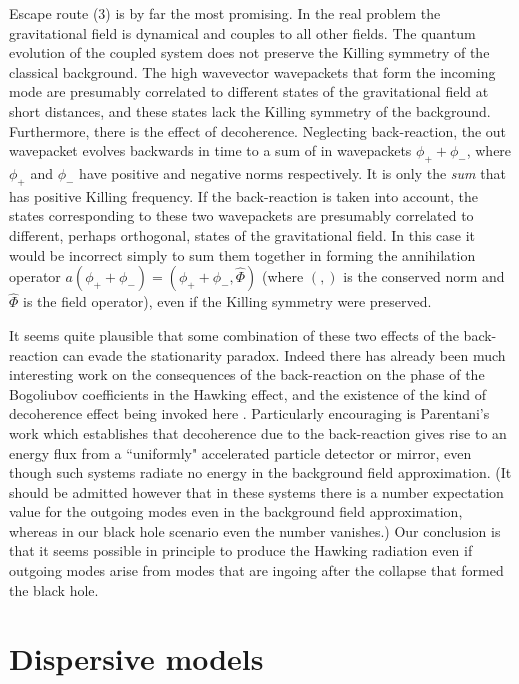 Escape route (3) is by far the most promising. In the real problem the
gravitational field is dynamical and couples to all other fields.  The
quantum evolution of the coupled system does not preserve the Killing
symmetry of the classical background. The high wavevector wavepackets
that form the incoming mode are presumably correlated to different
states of the gravitational field at short distances, and these states
lack the Killing symmetry of the background. Furthermore, there is the
effect of decoherence. Neglecting back-reaction, the out wavepacket
evolves backwards in time to a sum of in wavepackets $\phi_+ + \phi_-$,
where $\phi_+$ and $\phi_-$ have positive and negative norms
respectively.  It is only the {\it sum} that has positive Killing
frequency.  If the back-reaction is taken into account, the states
corresponding to these two wavepackets are presumably correlated to
different, perhaps orthogonal, states of the gravitational field. In
this case it would be incorrect simply to sum them together in forming
the annihilation operator $a(\phi_+ + \phi_-)=(\phi_+ +
\phi_-,\hat{\Phi})$ (where $(,)$ is the conserved norm and $\hat{\Phi}$
is the field operator), even if the Killing symmetry were preserved.

It seems quite plausible that some combination of these two effects of
the back-reaction can evade the stationarity paradox. Indeed there has
already been much interesting work on the consequences of the
back-reaction on the phase of the Bogoliubov coefficients in the
Hawking effect, and the existence of the kind of decoherence effect
being invoked here \cite{backreac}. Particularly encouraging is
Parentani's work which establishes that decoherence due to the
back-reaction gives rise to an energy flux from a ``uniformly"
accelerated particle detector\cite{Pare-det} or mirror\cite{Pare-mir},
even though such systems radiate no energy in the background field
approximation\cite{FullDavi,Grove}. (It should be admitted however that
in these systems there is a number expectation value for the outgoing
modes even in the background field approximation, whereas in our black
hole scenario even the number vanishes.) Our conclusion is that it
seems possible in principle to produce the Hawking radiation even if
outgoing modes arise from modes that are ingoing after the collapse
that formed the black hole.

\section{Dispersive models}

